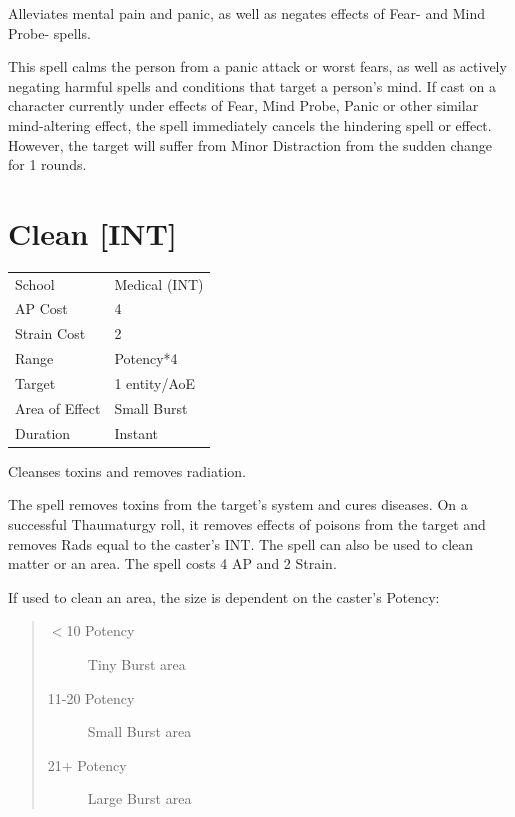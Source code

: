 \documentclass[11pt,a4paper,twocolumn]{book}
\begin{document}
\medskip

Alleviates mental pain and panic, as well as negates effects of Fear- and Mind Probe- spells.

This spell calms the person from a panic attack or worst fears, as well as actively negating harmful spells and conditions that target a person's mind. If cast on a character currently under effects of Fear, Mind Probe, Panic or other similar mind-altering effect, the spell immediately cancels the hindering spell or effect. However, the target will suffer from Minor Distraction from the sudden change for 1 rounds.


\section*{Clean [INT]}
{
	\begin{tabu} to 75mm{| X[l,4] | X[l,7] |}
		\hline
		School 			& Medical (INT) 		\\
        AP Cost	      	& 4 					\\
        Strain Cost     & 2 					\\
        Range     		& Potency*4 			\\
        Target      	& 1 entity/AoE 			\\
        Area of Effect  & Small Burst 	 		\\
        Duration     	& Instant 				\\ \hline
	\end{tabu}
		
}

\medskip

Cleanses toxins and removes radiation.

The spell removes toxins from the target's system and cures diseases. On a successful Thaumaturgy roll, it removes effects of poisons from the target and removes Rads equal to the caster's INT. The spell can also be used to clean matter or an area.
The spell costs 4 AP and 2 Strain.

If used to clean an area, the size is dependent on the caster's Potency:

\begin{quote}
  \begin{description}
    \item[$<$10 Potency] 	Tiny Burst area
    \item[11-20 Potency] 	Small Burst area
    \item[21+ Potency] 	Large Burst area
  \end{description}
\end{quote}
\end{document}

